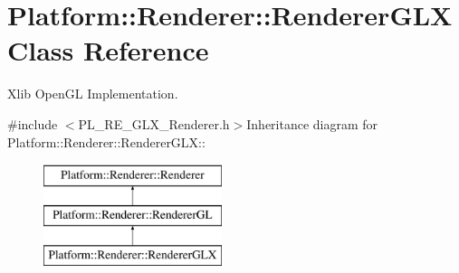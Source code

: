 \hypertarget{classPlatform_1_1Renderer_1_1RendererGLX}{
\section{Platform::Renderer::RendererGLX Class Reference}
\label{classPlatform_1_1Renderer_1_1RendererGLX}
}


Xlib OpenGL Implementation.  


{\ttfamily \#include $<$PL\_\-RE\_\-GLX\_\-Renderer.h$>$}Inheritance diagram for Platform::Renderer::RendererGLX::\begin{figure}[H]
\begin{center}
\leavevmode
\includegraphics[height=3cm]{classPlatform_1_1Renderer_1_1RendererGLX}
\end{center}
\end{figure}
